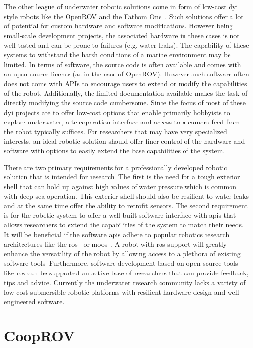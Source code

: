 \documentclass {udthesis}
\begin{document}
The other league of underwater robotic solutions come in form of low-cost \gls{dyi} style robots like the OpenROV \cite{openrov} and the Fathom One~\cite{fathomrov}. Such solutions offer a lot of potential for custom hardware and software modifications. However being small-scale development projects, the associated hardware in these cases is not well tested and can be prone to failures (e.g. water leaks). The capability of these systems to withstand the harsh conditions of a marine environment may be limited. In terms of software, the source code is often available and comes with an open-source license (as in the case of OpenROV). However such software often does not come with APIs to encourage users to extend or modify the capabilities of the robot. Additionally, the limited documentation available makes the task of directly modifying the source code cumbersome. Since the focus of most of these \gls{dyi} projects are to offer low-cost options that enable primarily hobbyists to explore underwater, a 
teleoperation 
interface and access to a camera feed from the robot typically suffices. For researchers that may have very specialized interests, an ideal robotic solution should offer finer control of the hardware and software with options to easily extend the base capabilities of the system.

There are two primary requirements for a professionally developed robotic solution that is intended for research. The first is the need for a tough exterior shell that can hold up against high values of water pressure which is common with deep sea operation. This exterior shell should also be resilient to water leaks and at the same time offer the ability to retrofit sensors. The second requirement is for the robotic system to offer a well built software interface with \gls{api}s that allows researchers to extend the capabilities of the system to match their needs. It will be beneficial if the software \gls{api}s adhere to popular robotics research architectures like the \gls{ros}~\cite{ros} or \gls{moos}~\cite{moos}. A robot with \gls{ros}-support will greatly enhance the versatility of the robot by allowing access to a plethora of existing software tools. Furthermore, software development based on open-source tools like \gls{ros} can be supported an active base of researchers that can provide feedback, 
tips and advice. Currently the underwater research community lacks a variety of low-cost submersible 
robotic platforms with resilient hardware design and well-engineered software.

\section{CoopROV}
\end{document}
